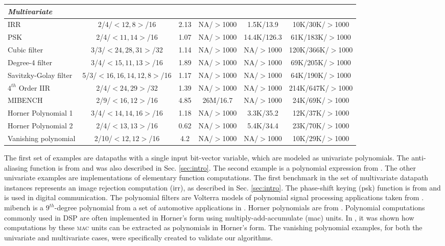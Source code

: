 \begin{table*}[htb]
\begin{center}
\begin{footnotesize}
\begin{tabular}{||l|c||c|c|c|c||}
{\it Multivariate}    &  & & & & \\ \hline
IRR                   & 2/4/$<12,8>$/16          & 2.13  & NA/$>$1000 & 1.5K/13.9   & 10K/30K/$>$1000 \\ \hline
PSK                   & 2/4/$<11,14>$/16         & 1.07  & NA/$>$1000 & 14.4K/126.3 & 61K/183K/$>$1000   \\ \hline
Cubic filter          & 3/3/$<24,28,31>$/32      & 1.14  & NA/$>$1000 & NA/$>$1000 & 120K/366K/$>$1000  \\ \hline
Degree-4 filter      & 3/4/$<15,11,13>$/16      & 1.89  & NA/$>$1000 & NA/$>$1000 & 69K/205K/$>$1000   \\ \hline
Savitzky-Golay filter & 5/3/$<16,16,14,12,8>$/16 & 1.17  & NA/$>$1000 & NA/$>$1000 & 64K/190K/$>$1000   \\ \hline
$4^{th}$ Order IIR    & 2/4/$<24,29>$/32         & 1.39  & NA/$>$1000 & NA/$>$1000 & 214K/647K/$>$1000 \\ \hline 
MIBENCH               & 2/9/$<16,12>$/16         & 4.85  & 26M/16.7  & NA/$>$1000 & 24K/69K/$>$1000    \\ \hline
Horner Polynomial 1   & 3/4/$<14,14,16>$/16      & 1.18  & NA/$>$1000 & 3.3K/35.2  & 12K/37K/$>$1000    \\ \hline
Horner Polynomial 2  & 2/4/$<13,13>$/16          & 0.62  & NA/$>$1000 & 5.4K/34.4  & 23K/70K/$>$1000    \\ \hline
Vanishing polynomial  & 2/10/$<12,12>$/16        & 4.2   & NA/$>$1000 & NA/$>$1000 & 10K/29K/$>$1000    \\ \hline
\end{tabular}
\end{footnotesize}
\end{center}
\end{table*}

The first set of examples are datapaths with a single input bit-vector
variable, which are modeled as univariate polynomials. The
anti-aliasing function is from \cite{demicheli:tcad_03} and was also
described in Sec. \ref{sec:intro}. The second example is a polynomial
expression from \cite{ienne}. The other univariate examples are
implementations of elementary function computations. The first
benchmark in the set of multivariate datapath instances represents an
image rejection computation ({\sc irr}), as described in
Sec. \ref{sec:intro}. The phase-shift keying ({\sc psk}) function is
from \cite{demicheli:tcad_03} and is used in digital
communication. The polynomial filters are Volterra models of
polynomial signal processing applications taken from
\cite{mathews:book}. {\sc mibench} is a $9^{th}$-degree polynomial
from a set of automotive applications in \cite{mibench}. Horner
polynomials are from \cite{ienne}.  Polynomial computations commonly
used in DSP are often implemented in Horner's form using
multiply-add-accumulate ({\sc mac}) units. In
\cite{demicheli:tcad_03}, it was shown how computations by these
\textsc{mac} units can be extracted as polynomials in Horner's 
form. The vanishing polynomial examples, for both the univariate and
multivariate cases, were specifically created to validate our
algorithms.

